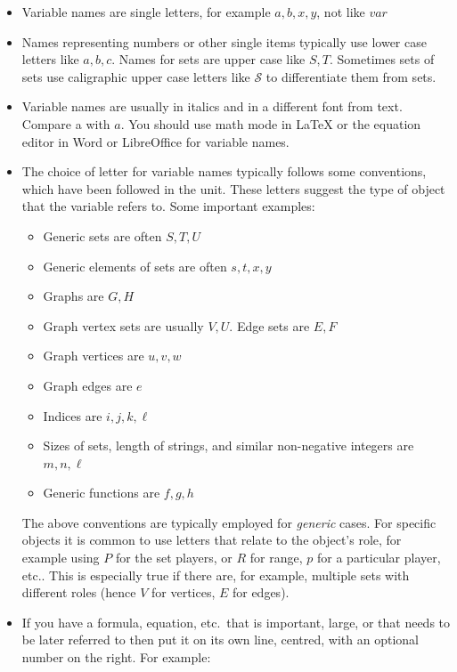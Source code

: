 \documentclass[a4paper]{article}
\begin{document}
\begin{itemize}
    \item Variable names are single letters, for example $a, b, x, y$, not like $var$
    \item Names representing numbers or other single items typically use lower case letters like $a, b, c$.  Names for sets are upper case like $S, T$.  Sometimes sets of sets use caligraphic upper case letters like $\mathcal{S}$ to differentiate them from sets.
    \item Variable names are usually in italics and in a different font from text.  Compare a with $a$.  You should use math mode in LaTeX or the equation editor in Word or LibreOffice for variable names.
    \item The choice of letter for variable names typically follows some conventions, which have been followed in the unit.  These letters suggest the type of object that the variable refers to.  Some important examples:
    \begin{itemize}
        \item Generic sets are often $S, T, U$
        \item Generic elements of sets are often $s, t, x, y$
        \item Graphs are $G, H$
        \item Graph vertex sets are usually $V, U$.  Edge sets are $E, F$
        \item Graph vertices are $u, v, w$
        \item Graph edges are $e$
        \item Indices are $i, j, k, \ell$
        \item Sizes of sets, length of strings, and similar non-negative integers are $m, n, \ell$
        \item Generic functions are $f, g, h$
    \end{itemize}
    The above conventions are typically employed for \emph{generic} cases.  For specific objects it is common to use letters that relate to the object's role, for example using $P$ for the set players, or $R$ for range, $p$ for a particular player, etc..  This is especially true if there are, for example, multiple sets with different roles (hence $V$ for vertices, $E$ for edges).
    \item If you have a formula, equation, etc.\ that is important, large, or that needs to be later referred to then put it on its own line, centred, with an optional number on the right.  For example:
    \begin{equation} \label{eq:polynomial}

\end{equation}
\end{itemize}
\end{document}
